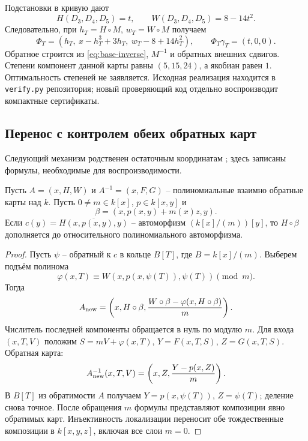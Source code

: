 Подстановки в кривую дают
\[
 H(D_3,D_4,D_5)=t,\qquad W(D_3,D_4,D_5)=8-14t^2.
\]
Следовательно, при $h_T=H\circ M$, $w_T=W\circ M$ получаем
\begin{equation}\label{eq:trefoil-rectifier}
 \Phi_T=(h_T,\ x-h_T^3+3h_T,\ w_T-8+14h_T^2),
 \qquad \Phi_T\gamma_T=(t,0,0).
\end{equation}
Обратное строится из \eqref{eq:base-inverse}, $M^{-1}$ и обратных
внешних сдвигов. Степени компонент данной карты равны $(5,15,24)$,
а якобиан равен $1$. Оптимальность степеней не заявляется.
Исходная реализация находится в \texttt{verify.py} репозитория;
новый проверяющий код отдельно воспроизводит компактные сертификаты.

\subsection{Перенос с контролем обеих обратных карт}
Следующий механизм родственен остаточным координатам
\cite{BD1993,EV2001,Lewis2024}; здесь записаны формулы, необходимые
для воспроизводимости.

\begin{proposition}\label{prop:transfer-app2}
Пусть $A=(x,H,W)$ и $A^{-1}=(x,F,G)$ -- полиномиальные взаимно
обратные карты над $k$. Пусть $0\ne m\in k[x]$, $p\in k[x,y]$ и
\[
 \beta=(x,p(x,y)+m(x)z,y).
\]
Если $c(y)=\overline{H(x,p(x,y),y)}$ -- автоморфизм
$(k[x]/(m))[y]$, то $H\circ\beta$ дополняется до относительного
полиномиального автоморфизма.
\end{proposition}
\begin{proof}
Пусть $\psi$ -- обратный к $c$ в кольце $B[T]$, где $B=k[x]/(m)$.
Выберем подъём полинома
\[
 \varphi(x,T)\equiv W(x,p(x,\psi(T)),\psi(T))\pmod m.
\]
Тогда
\begin{equation}\label{eq:transfer-forward}
 A_{\rm new}=
 \left(x,H\circ\beta,
 \frac{W\circ\beta-\varphi(x,H\circ\beta)}m\right).
\end{equation}
Числитель последней компоненты обращается в нуль по модулю $m$.
Для входа $(x,T,V)$ положим
$S=mV+\varphi(x,T)$, $Y=F(x,T,S)$, $Z=G(x,T,S)$. Обратная карта:
\begin{equation}\label{eq:transfer-inverse}
 A_{\rm new}^{-1}(x,T,V)=\left(x,Z,\frac{Y-p(x,Z)}m\right).
\end{equation}
В $B[T]$ из обратимости $A$ получаем
$Y=p(x,\psi(T))$, $Z=\psi(T)$; деление снова точное.
После обращения $m$ формулы представляют композиции явно обратимых
карт. Инъективность локализации переносит обе тождественные композиции
в $k[x,y,z]$, включая все слои $m=0$.
\end{proof}

